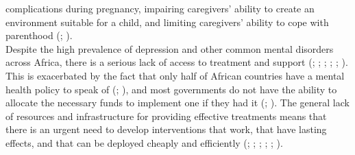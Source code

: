 \documentclass[stu,a4paper,12pt,donotrepeattitle]{apa7}
\begin{document}
complications during pregnancy, impairing caregivers' ability to create an
environment suitable for a child, and limiting caregivers' ability to cope with
parenthood (\cite{fernaetal21}; \cite{nyatetal16}).\\
Despite the high prevalence of depression and other common mental disorders
across Africa, there is a serious lack of access to treatment and support
(\cite{chibandaetal11}; \cite{chibandaetal15}; \cite{chibandaetal16};
\cite{douketal21}; \cite{fernaetal21}; \cite{logetal18}). This is exacerbated
by the fact that only half of African countries have a mental health policy to
speak of (\cite{lunetal14}; \cite{lunderal15}), and most governments do not have
the ability to allocate the necessary funds to implement one if they had it
(\cite{douketal21}; \cite{logetal18}). The general lack of resources and
infrastructure for providing effective treatments means that there is an urgent
need to develop interventions that work, that have lasting effects, and that can
be deployed cheaply and efficiently (\cite{douketal21}; \cite{lunetal14};
\cite{lunderal15}; \cite{Osetal20}; \cite{Osetal20b}; \cite{Oseral21}).
\end{document}
